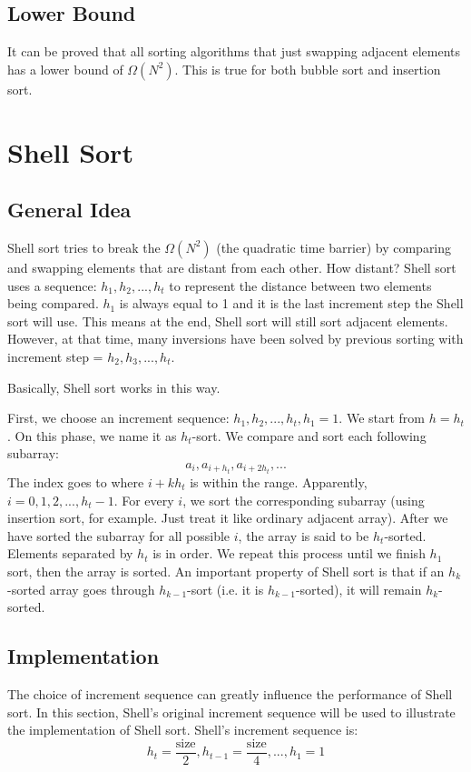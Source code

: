 \documentclass[11pt]{book}
\begin{document}
\section{Lower Bound}
\label{sec:orgd3bd63b}
It can be proved that all sorting algorithms that just swapping adjacent elements has a lower bound of \(\Omega(N^2)\). This is true for both bubble sort and insertion sort.
\chapter{Shell Sort}
\label{sec:org563f73b}
\section{General Idea}
\label{sec:org2250ada}
Shell sort tries to break the \(\Omega(N^2)\) (the quadratic time barrier) by comparing and swapping elements that are distant from each other. How distant? Shell sort uses a sequence: \(h_1, h_2, ..., h_t\) to represent the distance between two elements being compared. \(h_1\) is always equal to 1 and it is the last increment step the Shell sort will use. This means at the end, Shell sort will still sort adjacent elements. However, at that time, many inversions have been solved by previous sorting with increment step = \(h_2, h_3, ..., h_t\).

Basically, Shell sort works in this way.

First, we choose an increment sequence: \(h_1, h_2, ..., h_t, h_1 = 1\). We start from \(h = h_t\). On this phase, we name it as \(h_t\)-sort. We compare and sort each following subarray:
\begin{equation*}
a_i, a_{i + h_t}, a_{i + 2h_t}, ...
\end{equation*}
The index goes to where \(i + kh_t\) is within the range. Apparently, \(i = 0, 1, 2, ..., h_t - 1\). For every \(i\), we sort the corresponding subarray (using insertion sort, for example. Just treat it like ordinary adjacent array). After we have sorted the subarray for all possible \(i\), the array is said to be \(h_t\)-sorted. Elements separated by \(h_t\) is in order. We repeat this process until we finish \(h_1\) sort, then the array is sorted. An important property of Shell sort is that if an \(h_k\)-sorted array goes through \(h_{k - 1}\)-sort (i.e. it is \(h_{k - 1}\)-sorted), it will remain \(h_k\)-sorted.
\section{Implementation}
\label{sec:org8e311fd}
The choice of increment sequence can greatly influence the performance of Shell sort. In this section, Shell's original increment sequence will be used to illustrate the implementation of Shell sort. Shell's increment sequence is:
\[
h_t = \frac {\text {size}} {2}, h_{t - 1} = \frac {\text{size}} {4}, ..., h_1 = 1
\]
\end{document}
